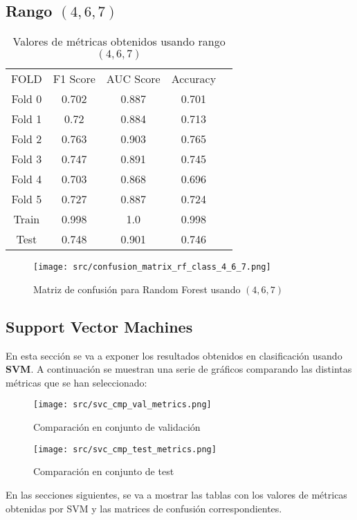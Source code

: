 \subsection*{Rango $(4,6,7)$}
\begin{table}[H]
	\centering
	\begin{tabular}{|c|c|c|c|c}
		\cline{1-4}
		FOLD   & F1 Score & AUC Score & Accuracy \\ \cline{1-4}
		Fold 0 & 0.702    & 0.887     & 0.701    \\  \cline{1-4}
		Fold 1 & 0.72     & 0.884     & 0.713    \\  \cline{1-4}
		Fold 2 & 0.763    & 0.903     & 0.765    \\  \cline{1-4}
		Fold 3 & 0.747    & 0.891     & 0.745    \\  \cline{1-4}
		Fold 4 & 0.703    & 0.868     & 0.696    \\  \cline{1-4}
		Fold 5 & 0.727    & 0.887     & 0.724    \\  \cline{1-4}
		Train  & 0.998    & 1.0       & 0.998    \\ \cline{1-4}
		Test   & 0.748    & 0.901     & 0.746    \\ \cline{1-4}
	\end{tabular}
	\caption{Valores de métricas obtenidos usando rango $(4,6,7)$}
\end{table}
\begin{figure}[H]
	\centering
	\texttt{[image: src/confusion\_matrix\_rf\_class\_4\_6\_7.png]}
	\caption{Matriz de confusión para Random Forest usando $(4,6,7)$}
	\label{fig:confusion_matrix_rf2}
\end{figure}
\pagebreak
\subsection{Support Vector Machines}
En esta sección se va a exponer los resultados obtenidos en clasificación usando \textbf{SVM}.
A continuación se muestran una serie de gráficos comparando las distintas métricas que se han seleccionado:
\begin{figure}[H]
	\centering
	\texttt{[image: src/svc\_cmp\_val\_metrics.png]}
	\caption{Comparación en conjunto de validación}
	\label{fig:svc_class_cmp_val}
\end{figure}

\begin{figure}[H]
	\centering
	\texttt{[image: src/svc\_cmp\_test\_metrics.png]}
	\caption{Comparación en conjunto de test}
	\label{fig:svc_class_cmp_test}
\end{figure}
En las secciones siguientes, se va a mostrar las tablas con los valores de métricas obtenidas por SVM y las matrices de confusión correspondientes.
